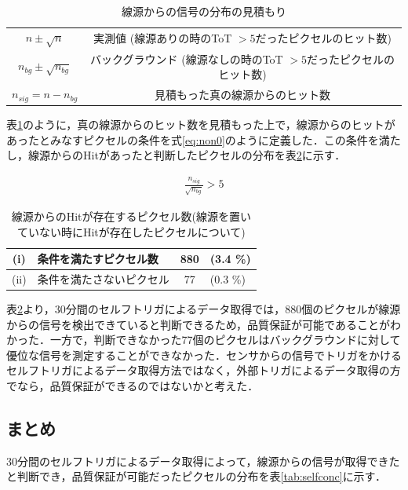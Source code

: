\begin{table}[h]
  \centering
  \caption{線源からの信号の分布の見積もり}
  \label{tb:selfnon0}
  \begin{tabular}{cc} \hline
    $n \pm \sqrt{n}$ & 実測値  (線源ありの時のToT $>5$だったピクセルのヒット数) \\
    $n_{bg} \pm \sqrt{n_{bg}}$ & バックグラウンド  (線源なしの時のToT $>5$だったピクセルのヒット数)\\
    $n_{sig} = n - n_{bg}$ & 見積もった真の線源からのヒット数 \\ \hline
  \end{tabular}
\end{table}

表\ref{tb:selfnon0}のように，真の線源からのヒット数を見積もった上で，線源からのヒットがあったとみなすピクセルの条件を式\ref{eq:non0}のように定義した．この条件を満たし，線源からのHitがあったと判断したピクセルの分布を表\ref{tab:non0dist}に示す．

\begin{eqnarray}
  \label{eq:non0}
  \frac{n_{sig}}{\sqrt{n_{bg}}} > 5
\end{eqnarray}

\begin{table}[h]
  \centering
  \caption{線源からのHitが存在するピクセル数(線源を置いていない時にHitが存在したピクセルについて)}
  \begin{tabular}{|cl|cl|} \hline
    (i) & 条件を満たすピクセル数 & 880 & (3.4 \%) \\ \hline
    (ii) & 条件を満たさないピクセル & 77 & (0.3 \%) \\ \hline
  \end{tabular}
  \label{tab:non0dist}
\end{table}

表\ref{tab:non0dist}より，30分間のセルフトリガによるデータ取得では，880個のピクセルが線源からの信号を検出できていると判断できるため，品質保証が可能であることがわかった．一方で，判断できなかった77個のピクセルはバックグラウンドに対して優位な信号を測定することができなかった．センサからの信号でトリガをかけるセルフトリガによるデータ取得方法ではなく，外部トリガによるデータ取得の方でなら，品質保証ができるのではないかと考えた．

\subsection*{まとめ}
30分間のセルフトリガによるデータ取得によって，線源からの信号が取得できたと判断でき，品質保証が可能だったピクセルの分布を表\ref{tab:selfconc}に示す．

